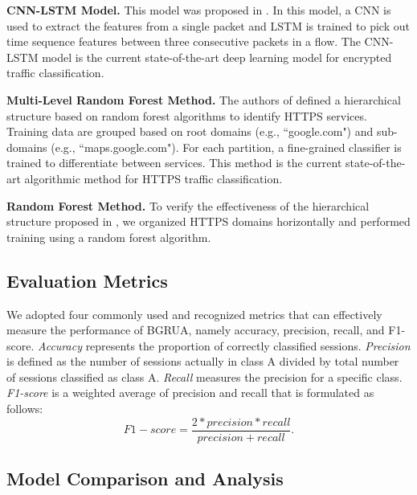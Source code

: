 \documentclass[preprint,12pt]{elsarticle}
\begin{document}
\textbf{CNN-LSTM Model.} This model was proposed in \cite{zou2018encrypted}. In this model, a CNN is used to extract the features from a single packet and LSTM is trained to pick out time sequence features between three consecutive packets in a flow. The CNN-LSTM model is the current state-of-the-art deep learning model for encrypted traffic classification.
 
\textbf{Multi-Level Random Forest Method.} The authors of \cite{shbair2016multi} defined a hierarchical structure based on random forest algorithms to identify HTTPS services. Training data are grouped based on root domains (e.g., ``google.com") and sub-domains (e.g., ``maps.google.com"). For each partition, a fine-grained classifier is trained to differentiate between services. This method is the current state-of-the-art algorithmic method for HTTPS traffic classification.

\textbf{Random Forest Method.} To verify the effectiveness of the hierarchical structure proposed in \cite{shbair2016multi}, we organized HTTPS domains horizontally and performed training using a random forest algorithm.  



\subsection{Evaluation Metrics} \label{sec: evaluation_metrics}
We adopted four commonly used and recognized metrics that can effectively measure the performance of BGRUA, namely accuracy, precision, recall, and F1-score. \textit{Accuracy} represents the proportion of correctly classified sessions. \textit{Precision} is defined as the number of sessions actually in class A divided by total number of sessions classified as class A. \textit{Recall} measures the precision for a specific class. \textit{F1-score} is a weighted average of precision and recall that is formulated as follows:
\begin{equation}
    F1-score = \frac{2 * precision * recall}{precision + recall}.
\end{equation}

\subsection{Model Comparison and Analysis} \label{sec: model comparison and analysis}
\end{document}
